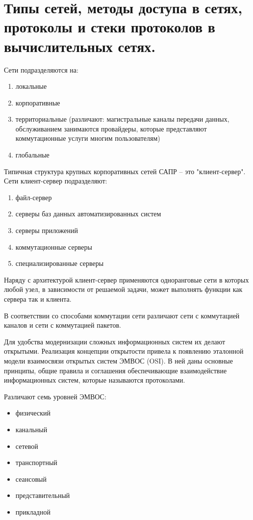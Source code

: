 \documentclass[unicode, 12pt, a4paper, oneside]{article}
\begin{document}
\section{Типы сетей, методы доступа в сетях, протоколы и стеки протоколов в вычислительных сетях.}

Сети подразделяются на:

\begin{enumerate}
\item локальные
\item корпоративные
\item территориальные (различают: магистральные каналы передачи данных, обслуживанием занимаются провайдеры, которые представляют коммутационные услуги многим пользователям)
\item глобальные
\end{enumerate}

Типичная структура крупных корпоративных сетей САПР – это "клиент-сервер". Сети клиент-сервер подразделяют:

\begin{enumerate}
\item файл-сервер
\item серверы баз данных автоматизированных систем
\item серверы приложений
\item коммутационные серверы
\item специализированные серверы
\end{enumerate}

Наряду с архитектурой клиент-сервер применяются одноранговые сети в которых любой узел, в зависимости от решаемой задачи, может выполнять функции как сервера так и клиента.

В соответствии со способами коммутации сети различают сети с коммутацией каналов и сети с коммутацией пакетов.

Для удобства модернизации сложных информационных систем их делают открытыми. Реализация концепции открытости привела к появлению эталонной модели взаимосвязи открытых систем ЭМВОС (OSI). В ней даны основные принципы, общие правила и соглашения обеспечивающие взаимодействие информационных систем, которые называются протоколами.

Различают семь уровней ЭМВОС:
\begin{itemize}
\item физический
\item канальный
\item сетевой
\item транспортный
\item сеансовый
\item представительный 
\item прикладной
\end{itemize}
\end{document}
